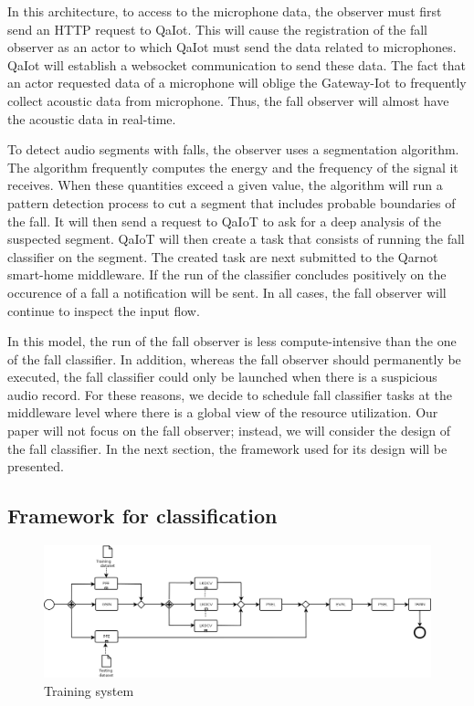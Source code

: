 \documentclass[10pt, conference, compsocconf]{IEEEtran}
\begin{document}
In this architecture, to access to the microphone data, the observer must first send an HTTP request to QaIot. 
This will cause the registration of the fall observer as an actor to which QaIot must send the data related to microphones. QaIot will 
establish a websocket communication to send these data. The fact that an actor requested data of a microphone will 
oblige the Gateway-Iot to frequently collect acoustic data from microphone. Thus, the fall observer will almost have 
the acoustic data in real-time. 

To detect audio segments with falls, the observer uses a segmentation algorithm. The algorithm frequently computes the energy 
and the frequency of the signal it receives. When these quantities exceed a given value, the 
algorithm will run a pattern detection process to cut a segment that includes probable boundaries of the fall. 
It will then send a request to QaIoT to ask for a deep analysis of the suspected segment. QaIoT will then create a task that 
consists of running the fall classifier on the segment. The created task are next submitted to the Qarnot smart-home middleware. 
If the run of the classifier concludes positively on the occurence of a fall a notification will be sent. In all cases, the 
fall observer will continue to inspect the input flow.

In this model, the run of the fall observer is less compute-intensive than the one of the fall 
classifier. In addition, whereas the fall observer should permanently be executed, the fall classifier could only be launched  
when there is a suspicious audio record. For these reasons, we decide to schedule fall classifier tasks at the middleware 
level where there is a global view of the resource utilization. Our paper will not focus on the fall observer; instead, 
we will consider the design of the fall classifier. In the next section, the framework used for its design will be 
presented. 


\subsection{Framework for classification} 
\begin{figure}[htbp]
  \captionsetup{aboveskip=-5pt}
	\centering
	\includegraphics[scale=0.3]{./Figures/workflow.png}
	\caption{Training system}
	\label{fig:training}
	\end{figure}
\end{document}
